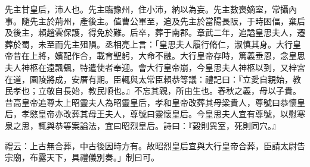 
\begin{pinyinscope}
先主甘皇后，沛人也。先主臨豫州，住小沛，納以為妄。先主數喪嫡室，常攝內事。隨先主於荊州，產後主。值曹公軍至，追及先主於當陽長阪，于時困偪，棄后及後主，賴趙雲保護，得免於難。后卒，葬于南郡。章武二年，追謚皇思夫人，遷葬於蜀，未至而先主殂隕。丞相亮上言：「皇思夫人履行脩仁，淑慎其身。大行皇帝昔在上將，嬪配作合，載育聖躬，大命不融。大行皇帝存時，篤義垂恩，念皇思夫人神柩在遠飄颻，特遣使者奉迎。會大行皇帝崩，今皇思夫人神柩以到，又梓宮在道，園陵將成，安厝有期。臣輒與太常臣賴恭等議：禮記曰：『立愛自親始，教民孝也；立敬自長始，教民順也。』不忘其親，所由生也。春秋之義，母以子貴。昔高皇帝追尊太上昭靈夫人為昭靈皇后，孝和皇帝改葬其母梁貴人，尊號曰恭懷皇后，孝愍皇帝亦改葬其母王夫人，尊號曰靈懷皇后。今皇思夫人宜有尊號，以慰寒泉之思，輒與恭等案謚法，宜曰昭烈皇后。詩曰：『穀則異室，死則同穴。』

禮云：上古無合葬，中古後因時方有。故昭烈皇后宜與大行皇帝合葬，臣請太尉告宗廟，布露天下，具禮儀別奏。」制曰可。


\end{pinyinscope}